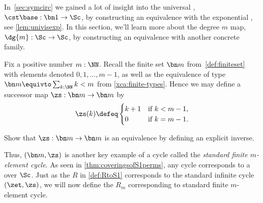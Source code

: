 In~\cref{sec:symcirc} we gained a lot of insight into
the universal \covering, $\cst\base:\bn 1\to\Sc$,
by constructing an equivalence with the exponential \covering,
see \cref{lem:univisexp}.
In this section, we'll learn more about the degree $m$ map,
$\dg{m}:\Sc\to\Sc$,
by constructing an equivalence with another concrete family.

Fix a positive number $m:\NN$. Recall the finite set $\bn m$
from~\cref{def:finiteset} with elements denoted $0,1,\dots,m-1$,
as well as the equivalence of type $\bn m \equivto \sum_{k:\NN}k<m$
from \cref{xca:finite-types}.
Hence we may define a successor map $\zs : \bn m \to \bn m$ by
\[
  \zs(k) \defeq
  \begin{cases}
    k+1 & \text{if $k<m-1$,} \\
    0   & \text{if $k=m-1$.}
  \end{cases}
\]
\begin{exercise}
  Show that $\zs : \bn m \to \bn m$ is an equivalence by defining
  an explicit inverse.
\end{exercise}
Thus, $(\bn m,\zs)$ is another key example of a cycle called
the \emph{standard finite $m$-element cycle}.
As seen in \cref{thm:coveringsofS1perms},
any cycle corresponds to a \covering over $\Sc$.
Just as the \covering $R$ in \cref{def:RtoS1} corresponds to
the standard infinite cycle $(\zet,\zs)$,
we will now define the \covering $R_m$ corresponding to
standard finite $m$-element cycle.


